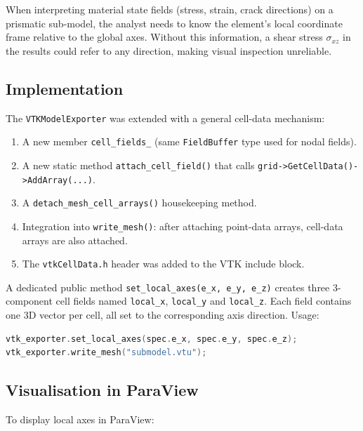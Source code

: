 When interpreting material state fields (stress, strain, crack
directions) on a prismatic sub-model, the analyst needs to know the
element's local coordinate frame relative to the global axes.  Without
this information, a shear stress $\sigma_{xz}$ in the results could
refer to any direction, making visual inspection unreliable.

\subsection{Implementation}

The \texttt{VTKModelExporter} was extended with a general cell-data
mechanism:

\begin{enumerate}
  \item A new member \texttt{cell\_fields\_} (same \texttt{FieldBuffer}
        type used for nodal fields).
  \item A new static method \texttt{attach\_cell\_field()} that calls
        \texttt{grid->GetCellData()->AddArray(...)}.
  \item A \texttt{detach\_mesh\_cell\_arrays()} housekeeping method.
  \item Integration into \texttt{write\_mesh()}: after attaching
        point-data arrays, cell-data arrays are also attached.
  \item The \texttt{vtkCellData.h} header was added to the VTK include
        block.
\end{enumerate}

A dedicated public method \texttt{set\_local\_axes(e\_x, e\_y, e\_z)}
creates three 3-component cell fields named \texttt{local\_x},
\texttt{local\_y} and \texttt{local\_z}.  Each field contains one
3D vector per cell, all set to the corresponding axis direction.
Usage:

\begin{lstlisting}[language=C++, basicstyle=\ttfamily\small]
vtk_exporter.set_local_axes(spec.e_x, spec.e_y, spec.e_z);
vtk_exporter.write_mesh("submodel.vtu");
\end{lstlisting}

\subsection{Visualisation in ParaView}

To display local axes in ParaView:

